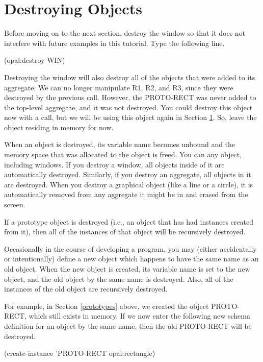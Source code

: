 \section{Destroying Objects}
\label{destroying}

Before moving on to the next section, destroy the window so that it
does not interfere with future examples in this tutorial.  Type the
following line.

\begin{programexample}
(opal:destroy WIN)
\end{programexample}
				
Destroying the window will also destroy all of the objects that were
added to its aggregate.  We can no longer manipulate R1, R2, and R3,
since they were destroyed by the previous call.  However, the
PROTO-RECT was never added to the top-level aggregate, and it was not
destroyed.  You could destroy this object now with a 
call, but we will be using this object again in Section
\ref{destroying}.  So, leave the object residing in memory for now.

When an object is destroyed, its variable name becomes unbound and the
memory space that was allocated to the object is freed.  You can
 any object, including windows.  If you destroy a window,
all objects inside of it are automatically destroyed.  Similarly, if
you destroy an aggregate, all objects in it are destroyed.  When you
destroy a graphical object (like a line or a circle), it is
automatically removed from any aggregate it might be in and erased
from the screen.

If a prototype object is destroyed (i.e., an object that has had
instances created from it), then all of the instances of that object
will be recursively destroyed.

Occasionally in the course of developing a program, you may (either
accidentally or intentionally) define a new object which happens to
have the same name as an old object.  When the new object is created,
its variable name is set to the new object, and the old object by the
same name is destroyed.  Also, all of the instances of the old object
are recursively destroyed.

For example, in Section \ref{prototypes} above, we created the object
PROTO-RECT, which still exists in memory.  If we now enter the
following new schema definition for an object by the same name, then
the old PROTO-RECT will be destroyed.

\begin{programexample}
(create-instance 'PROTO-RECT opal:rectangle)
\end{programexample}

